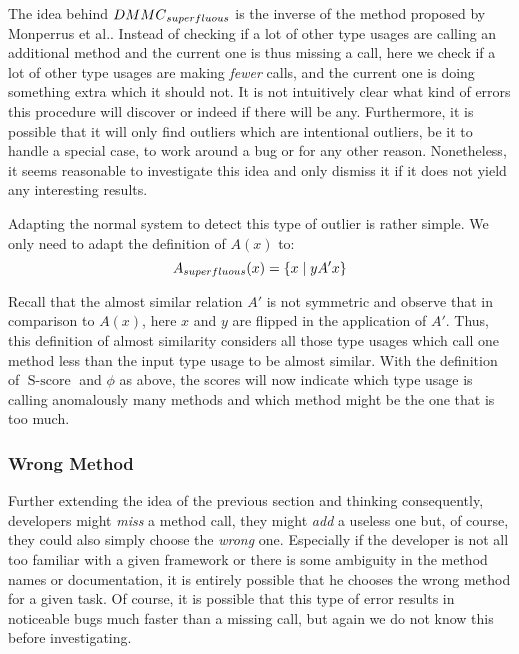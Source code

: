 The idea behind $\mathnormal{DMMC}_{\mathnormal{superfluous}}$ is the inverse of the method proposed by Monperrus et al..
Instead of checking if a lot of other type usages are calling an additional method and the current one is thus missing a call, here we check if a lot of other type usages are making \emph{fewer} calls, and the current one is doing something extra which it should not.
It is not intuitively clear what kind of errors this procedure will discover or indeed if there will be any.
Furthermore, it is possible that it will only find outliers which are intentional outliers, be it to handle a special case, to work around a bug or for any other reason.
Nonetheless, it seems reasonable to investigate this idea and only dismiss it if it does not yield any interesting results.


Adapting the normal system to detect this type of outlier is rather simple.
We only need to adapt the definition of $A(x)$ to:
\begin{equation*}
    A_{\mathnormal{superfluous}}(x) = \{x \mid yA'x \}
\end{equation*}

Recall that the almost similar relation $A'$ is not symmetric and observe that in comparison to $A(x)$, here $x$ and $y$ are flipped in the application of $A'$. 
Thus, this definition of almost similarity considers all those type usages which call one method less than the input type usage to be almost similar.
With the definition of $\operatorname{S-score}$ and $\phi$ as above, the scores will now indicate which type usage is calling anomalously many methods and which method might be the one that is too much.

\subsubsection{Wrong Method}

Further extending the idea of the previous section and thinking consequently, developers might \emph{miss} a method call, they might \emph{add} a useless one but, of course, they could also simply choose the \emph{wrong} one.
Especially if the developer is not all too familiar with a given framework or there is some ambiguity in the method names or documentation, it is entirely possible that he chooses the wrong method for a given task.
Of course, it is possible that this type of error results in noticeable bugs much faster than a missing call, but again we do not know this before investigating.

